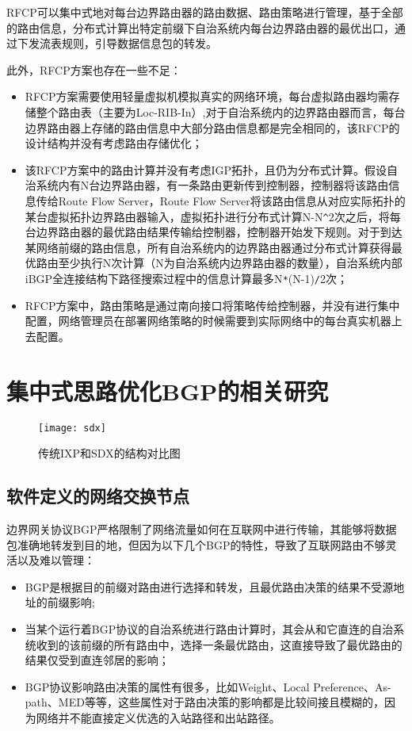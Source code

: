 RFCP可以集中式地对每台边界路由器的路由数据、路由策略进行管理，基于全部的路由信息，分布式计算出特定前缀下自治系统内每台边界路由器的最优出口，通过下发流表规则，引导数据信息包的转发。

此外，RFCP方案也存在一些不足：
\begin{itemize}
\item RFCP方案需要使用轻量虚拟机模拟真实的网络环境，每台虚拟路由器均需存储整个路由表（主要为Loc-RIB-In）,对于自治系统内的边界路由器而言，每台边界路由器上存储的路由信息中大部分路由信息都是完全相同的，该RFCP的设计结构并没有考虑路由存储优化；
\item 该RFCP方案中的路由计算并没有考虑IGP拓扑，且仍为分布式计算。假设自治系统内有N台边界路由器，有一条路由更新传到控制器，控制器将该路由信息传给Route Flow Server，Route Flow Server将该路由信息从对应实际拓扑的某台虚拟拓扑边界路由器输入，虚拟拓扑进行分布式计算N-N\verb+^+2次之后，将每台边界路由器的最优路由结果传输给控制器，控制器开始发下规则。对于到达某网络前缀的路由信息，所有自治系统内的边界路由器通过分布式计算获得最优路由至少执行N次计算（N为自治系统内边界路由器的数量），自治系统内部iBGP全连接结构下路径搜索过程中的信息计算最多N\verb+*+(N-1)\verb+/+2次；
\item RFCP方案中，路由策略是通过南向接口将策略传给控制器，并没有进行集中配置，网络管理员在部署网络策略的时候需要到实际网络中的每台真实机器上去配置。
\end{itemize}

\section{集中式思路优化BGP的相关研究}

\begin{figure}
  \centering
  \texttt{[image: sdx]}
  \caption{传统IXP和SDX的结构对比图}
  \label{fig:sdx}
\end{figure}

\subsection{软件定义的网络交换节点}
边界网关协议BGP严格限制了网络流量如何在互联网中进行传输，其能够将数据包准确地转发到目的地，但因为以下几个BGP的特性，导致了互联网路由不够灵活以及难以管理\cite{sdx2015sigcomm}：
\begin{itemize}
  \item BGP是根据目的前缀对路由进行选择和转发，且最优路由决策的结果不受源地址的前缀影响;
  \item 当某个运行着BGP协议的自治系统进行路由计算时，其会从和它直连的自治系统收到的该前缀的所有路由中，选择一条最优路由，这直接导致了最优路由的结果仅受到直连邻居的影响；
  \item BGP协议影响路由决策的属性有很多，比如Weight、Local Preference、As-path、MED等等，这些属性对于路由决策的影响都是比较间接且模糊的，因为网络并不能直接定义优选的入站路径和出站路径。
\end{itemize}

